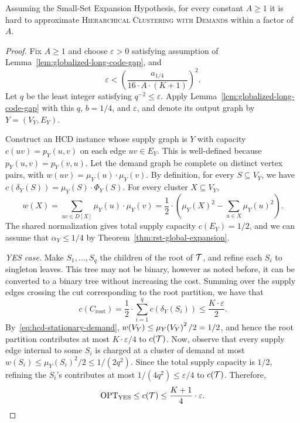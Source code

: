 \begin{theorem}\label{thm:sse-hcd-hardness}
    Assuming the Small-Set Expansion Hypothesis, for every constant $A\geq 1$ it is hard to approximate \textsc{Hierarchical Clustering with Demands} within a factor of $A$.
\end{theorem}
\begin{proof}
    Fix $A\geq 1$ and choose $\varepsilon>0$ satisfying assumption of Lemma~\ref{lem:globalized-long-code-gap}, and
    \[
        \varepsilon<\left(\frac{a_{1/4}}{16\cdot A\cdot (K+1)}\right)^2.
    \]
    Let $q$ be the least integer satisfying $q^{-2}\leq\varepsilon$. Apply Lemma~\ref{lem:globalized-long-code-gap} with this $q$, $b=1/4$, and $\varepsilon$, and denote its output graph by $Y=(V_Y,E_Y)$.

    Construct an HCD instance whose supply graph is $Y$ with capacity $c(uv)=p_Y(u,v)$ on each edge $uv\in E_Y$. This is well-defined because $p_Y(u,v)=p_Y(v,u)$. Let the demand graph be complete on distinct vertex pairs, with $w(uv)=\mu_Y(u)\cdot \mu_Y(v)$. By definition, for every $S\subseteq V_Y$, we have $
        c(\delta_Y(S))=\mu_Y(S)\cdot \Phi_Y(S).$
    For every cluster $X\subseteq V_Y$,
    \begin{equation}\label{eq:hcd-stationary-demand}
        w(X)=\sum_{uv\in D[X]}\mu_Y(u)\cdot \mu_Y(v)
        =\frac12\cdot \left(\mu_Y(X)^2-\sum_{u\in X}\mu_Y(u)^2\right).
    \end{equation}
    The shared normalization gives total supply capacity $c(E_Y)=1/2$, and we can assume that $\alpha_Y\leq1/4$ by Theorem~\ref{thm:rst-global-expansion}.

    \emph{YES case.} Make $S_1,\ldots,S_q$ the children of the root of $\mathcal{T}$, and refine each $S_i$ to singleton leaves. This tree may not be binary, however as noted before, it can be converted to a binary tree without increasing the cost.
    Summing over the supply edges crossing the cut corresponding to the root partition, we have that
    \[
        c(C_{\mathrm{root}})=\frac12\cdot\sum_{i=1}^q c(\delta_Y(S_i))
        \leq\frac{K\cdot\varepsilon}{2}.
    \]
    By~\eqref{eq:hcd-stationary-demand}, $w(V_Y)\leq\mu_Y\mathopen{}\left( V_Y \right)^2/2=1/2$, and hence the root partition contributes at most $K\cdot\varepsilon/4$ to $c\mathopen{}\left( \mathcal{T} \right)$. Now, observe that every supply edge internal to some $S_i$ is charged at a cluster of demand at most $w(S_i)\leq\mu_Y(S_i)^2/2\leq1/(2q^2)$. Since the total supply capacity is $1/2$, refining the $S_i$'s contributes at most $1/(4q^2)\leq\varepsilon/4$ to $c\mathopen{}\left( \mathcal{T} \right)$. Therefore,
    \[
        \operatorname{OPT}_{\mathrm{YES}}\leq c\mathopen{}\left( \mathcal{T} \right)
        \leq\frac{K+1}{4}\cdot \varepsilon.
    \]


\end{proof}
